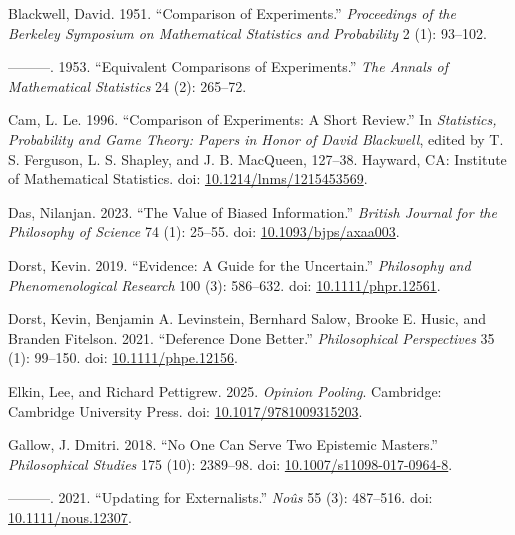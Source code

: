 \documentclass[
  11pt,
  letterpaper,
  DIV=11,
  numbers=noendperiod,
  twoside]{scrartcl}
\newlength{\cslhangindent}
\newenvironment{CSLReferences}[2] %
 {\begin{list}{}{%
  \setlength{\itemindent}{0pt}
  \setlength{\leftmargin}{0pt}
  \setlength{\parsep}{0pt}
  \ifodd #1
   \setlength{\leftmargin}{\cslhangindent}
   \setlength{\itemindent}{-1\cslhangindent}
  \fi
  \setlength{\itemsep}{#2\baselineskip}}}
 {\end{list}}
\begin{document}
\label{refs}
\begin{CSLReferences}{1}{0}
Blackwell, David. 1951. {``Comparison of Experiments.''}
\emph{Proceedings of the Berkeley Symposium on Mathematical Statistics
and Probability} 2 (1): 93--102.

---------. 1953. {``Equivalent Comparisons of Experiments.''} \emph{The
Annals of Mathematical Statistics} 24 (2): 265--72.

Cam, L. Le. 1996. {``Comparison of Experiments: A Short Review.''} In
\emph{Statistics, Probability and Game Theory: Papers in Honor of David
Blackwell}, edited by T. S. Ferguson, L. S. Shapley, and J. B. MacQueen,
127--38. Hayward, CA: Institute of Mathematical Statistics. doi:
\href{https://doi.org/10.1214/lnms/1215453569}{10.1214/lnms/1215453569}.

Das, Nilanjan. 2023. {``The Value of Biased Information.''}
\emph{British Journal for the Philosophy of Science} 74 (1): 25--55.
doi: \href{https://doi.org/10.1093/bjps/axaa003}{10.1093/bjps/axaa003}.

Dorst, Kevin. 2019. {``Evidence: A Guide for the Uncertain.''}
\emph{Philosophy and Phenomenological Research} 100 (3): 586--632. doi:
\href{https://doi.org/10.1111/phpr.12561}{10.1111/phpr.12561}.

Dorst, Kevin, Benjamin A. Levinstein, Bernhard Salow, Brooke E. Husic,
and Branden Fitelson. 2021. {``Deference Done Better.''}
\emph{Philosophical Perspectives} 35 (1): 99--150. doi:
\href{https://doi.org/10.1111/phpe.12156}{10.1111/phpe.12156}.

Elkin, Lee, and Richard Pettigrew. 2025. \emph{Opinion Pooling}.
Cambridge: Cambridge University Press. doi:
\href{https://doi.org/10.1017/9781009315203}{10.1017/9781009315203}.

Gallow, J. Dmitri. 2018. {``No One Can Serve Two Epistemic Masters.''}
\emph{Philosophical Studies} 175 (10): 2389--98. doi:
\href{https://doi.org/10.1007/s11098-017-0964-8}{10.1007/s11098-017-0964-8}.

---------. 2021. {``Updating for Externalists.''} \emph{Noûs} 55 (3):
487--516. doi:
\href{https://doi.org/10.1111/nous.12307}{10.1111/nous.12307}.


\end{CSLReferences}
\end{document}
